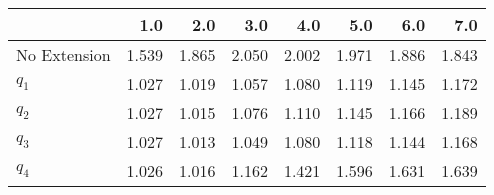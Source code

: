\begin{tabular}{lrrrrrrr}
\toprule
{} &   1.0 &   2.0 &   3.0 &   4.0 &   5.0 &   6.0 &   7.0 \\
\midrule
No Extension & 1.539 & 1.865 & 2.050 & 2.002 & 1.971 & 1.886 & 1.843 \\
$q_1$        & 1.027 & 1.019 & 1.057 & 1.080 & 1.119 & 1.145 & 1.172 \\
$q_2$        & 1.027 & 1.015 & 1.076 & 1.110 & 1.145 & 1.166 & 1.189 \\
$q_3$        & 1.027 & 1.013 & 1.049 & 1.080 & 1.118 & 1.144 & 1.168 \\
$q_4$        & 1.026 & 1.016 & 1.162 & 1.421 & 1.596 & 1.631 & 1.639 \\
\bottomrule
\end{tabular}
